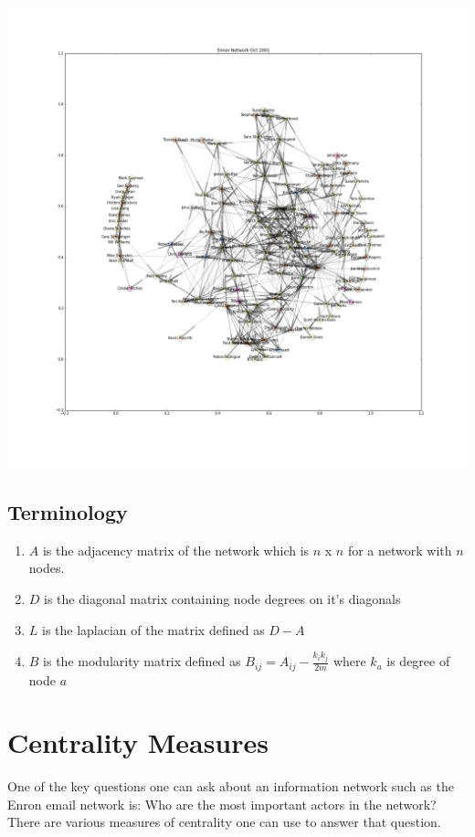 \documentclass[12pt]{article}
\begin{document}
	\includegraphics[width=1\textwidth]{figureEnronOct2001}
	
	\subsection{Terminology}
	\begin{enumerate}
		\item $A$ is the adjacency matrix of the network which is $n$ x $n$ for a network with $n$ nodes.
		\item $D$ is the diagonal matrix containing node degrees on it's diagonals
		\item $L$ is the laplacian of the matrix defined as $D - A$
		\item $B$ is the modularity matrix defined as $B_{ij} = A_{ij} - \frac{k_i k_j}{2m}$ where $k_a$ is degree of node $a$
	\end{enumerate}

\section{Centrality Measures} One of the key questions one can ask about an information network such as the Enron email network is: Who are the most important actors in the network? There are various measures of centrality one can use to answer that question.	
\end{document}
